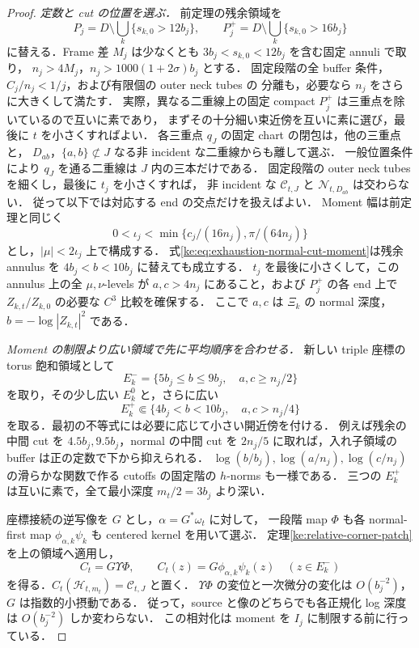 \begin{proof}
\emph{定数と cut の位置を選ぶ．}
前定理の残余領域を
\[
 P_j=D\setminus\bigcup_k\{s_{k,0}>12b_j\},\qquad
 P_j^+=D\setminus\bigcup_k\{s_{k,0}>16b_j\}
\]
に替える．Frame 差 $M_j$ は少なくとも $3b_j<s_{k,0}<12b_j$ を含む固定 annuli で取り，
$n_j>4M_j$，$n_j>1000(1+2\sigma)b_j$ とする．
固定段階の全 buffer 条件，$C_j/n_j<1/j$，および有限個の outer neck tubes の
分離も，必要なら $n_j$ をさらに大きくして満たす．
実際，異なる二重線上の固定 compact $P_j^+$ は三重点を除いているので互いに素であり，
まずその十分細い束近傍を互いに素に選び，最後に $t$ を小さくすればよい．
各三重点 $q_J$ の固定 chart の閉包は，他の三重点と，
$D_{ab}$，$\{a,b\}\not\subset J$ なる非 incident な二重線からも離して選ぶ．
一般位置条件により $q_J$ を通る二重線は $J$ 内の三本だけである．
固定段階の outer neck tubes を細くし，最後に $t_j$ を小さくすれば，
非 incident な $\mathcal C_{t,J}$ と $\mathcal N_{t,D_{ab}}$ は交わらない．
従って以下では対応する end の交点だけを扱えばよい．
Moment 幅は前定理と同じく
\[
 0<\iota_j<\min\{c_j/(16n_j),\pi/(64n_j)\}
\]
とし，$|\mu|<2\iota_j$ 上で構成する．
式\eqref{ke:eq:exhaustion-normal-cut-moment}は残余 annulus を
$4b_j<b<10b_j$ に替えても成立する．
$t_j$ を最後に小さくして，この annulus 上の全 $\mu,\nu$-levels が
$a,c>4n_j$ にあること，および $P_j^+$ の各 end 上で
$Z_{k,t}/Z_{k,0}$ の必要な $C^3$ 比較を確保する．
ここで $a,c$ は $\Xi_k$ の normal 深度，$b=-\log|Z_{k,t}|^2$ である．

\emph{Moment の制限より広い領域で先に平均順序を合わせる．}
新しい triple 座標の torus 飽和領域として
\[
 E_k^-=\{5b_j\le b\le9b_j,\quad a,c\ge n_j/2\}
\]
を取り，その少し広い $E_k^0$ と，さらに広い
\[
 E_k^+\Subset\{4b_j<b<10b_j,\quad a,c>n_j/4\}
\]
を取る．最初の不等式には必要に応じて小さい開近傍を付ける．
例えば残余の中間 cut を $4.5b_j,9.5b_j$，normal の中間 cut を $2n_j/5$
に取れば，入れ子領域の buffer は正の定数で下から抑えられる．
$\log(b/b_j),\log(a/n_j),\log(c/n_j)$ の滑らかな関数で作る
cutoffs の固定階の $h$-norms も一様である．
三つの $E_k^+$ は互いに素で，全て最小深度 $m_t/2=3b_j$ より深い．

座標接続の逆写像を $G$ とし，$\alpha=G^*\omega_t$ に対して，
一段階 map $\Phi$ も各 normal-first map $\phi_{\alpha,k}\psi_k$ も
centered kernel を用いて選ぶ．
定理\ref{ke:relative-corner-patch}を上の領域へ適用し，
\[
 C_t=G\Upsilon\Phi,\qquad
 C_t(z)=G\phi_{\alpha,k}\psi_k(z)\quad(z\in E_k^-)
\]
を得る．$C_t(\mathcal H_{t,m_t})=\mathcal C_{t,J}$ と置く．
$\Upsilon\Phi$ の変位と一次微分の変化は $O(b_j^{-2})$，
$G$ は指数的小摂動である．
従って，source と像のどちらでも各正規化 log 深度は $O(b_j^{-2})$ しか変わらない．
この相対化は moment を $I_j$ に制限する前に行っている．


\end{proof}
